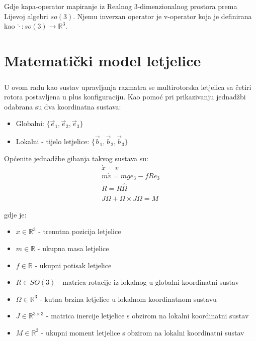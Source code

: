 \documentclass[times, utf8, diplomski]{fer}
\begin{document}
	\noindent Gdje kapa-operator mapiranje iz Realnog 3-dimenzionalnog prostora prema Lijevoj algebri $so(3)$. Njemu inverzan operator je v-operator koja je definirana kao $\check{\cdot}:so(3) \rightarrow \mathbb{R}^3$.
	
\chapter{Matematički model letjelice}

\paragraph{}U ovom radu kao sustav upravljanja razmatra se multirotorska letjelica sa četiri rotora postavljena u plus konfiguraciju. Kao pomoć pri prikazivanju jednadžbi odabrana su dva koordinatna sustava: 
\begin{itemize}
	\item Globalni: $\{\vec{e}_1, \vec{e}_2, \vec{e}_3\}$
	\item Lokalni - tijelo letjelice: $\{\vec{b}_1, \vec{b}_2, \vec{b}_3\}$
\end{itemize}

\noindent Općenite jednadžbe gibanja takvog sustava su:
\begin{gather}
	\dot{x} = v \\
	m \dot{v} = mge_3 - fRe_3 \label{thrust_dyn}\\
	\dot{R} = R\hat{\Omega} \label{model_ang} \\
	J\dot{\Omega} + \Omega \times J\Omega = M 
\end{gather}

gdje je:
\begin{itemize}
	\item $x \in \mathbb{R}^3$ - trenutna pozicija letjelice
	
	\item $m \in \mathbb{R}$ - ukupna masa letjelice
	
	\item $f \in \mathbb{R}$ - ukupni potisak letjelice 
	
	\item $R \in SO(3)$ - matrica rotacije iz lokalnog u globalni koordinatni sustav
	
	\item $\Omega \in \mathbb{R}^3$ - kutna brzina letjelice u lokalnom koordinatnom sustavu
	
	\item $J \in \mathbb{R}^{3\times3}$ - matrica inercije letjelice s obzirom na lokalni koordinatni sustav
	
	\item $M \in \mathbb{R}^3$ - ukupni moment letjelice s obzirom na lokalni koordinatni sustav
\end{itemize}
\end{document}
